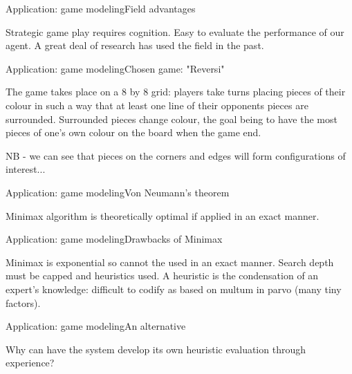 \begin{frame}{Application: game modeling}{Field advantages}

Strategic game play requires cognition. Easy to evaluate the performance of our 
agent. A great deal of research has used  the field in the past.

\end{frame}

\begin{frame}{Application: game modeling}{Chosen game: "Reversi"}

The game takes place on a 8 by 8 grid: players take turns placing pieces of their
colour in such a way that at least one line of their opponents pieces are
surrounded. Surrounded pieces change colour, the goal being to have the most 
pieces of one's own colour on the board when the game end.

NB - we can see that pieces on the corners and edges will form configurations of 
interest...

\end{frame}

\begin{frame}{Application: game modeling}{Von Neumann's theorem}

Minimax algorithm is theoretically optimal if applied in an exact manner.

\end{frame}

\begin{frame}{Application: game modeling}{Drawbacks of Minimax}

Minimax is exponential so cannot the used in an exact manner. Search depth must 
be capped and heuristics used. A heuristic is the condensation of an expert's 
knowledge: difficult to codify as based on multum in parvo (many tiny factors).

\end{frame}

\begin{frame}{Application: game modeling}{An alternative}

Why can have the system develop its own heuristic evaluation through experience?

\end{frame}
